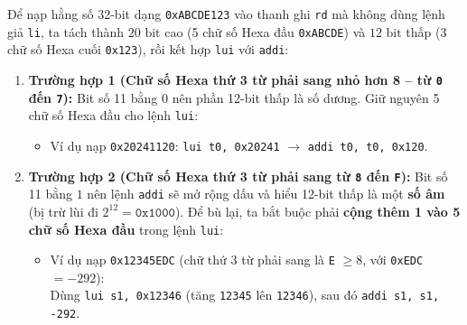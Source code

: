 \begin{tcolorbox}[bwbox, title={Quy tắc nạp hằng số 32-bit bất kỳ vào thanh ghi (Bản chất của lệnh giả \texttt{li})}]
Để nạp hằng số 32-bit dạng \texttt{0xABCDE123} vào thanh ghi \texttt{rd} mà không dùng lệnh giả \texttt{li}, ta tách thành $20\text{ bit}$ cao (5 chữ số Hexa đầu \texttt{0xABCDE}) và $12\text{ bit}$ thấp (3 chữ số Hexa cuối \texttt{0x123}), rồi kết hợp \texttt{lui} với \texttt{addi}:
\begin{enumerate}
    \item \textbf{Trường hợp 1 (Chữ số Hexa thứ 3 từ phải sang nhỏ hơn 8 -- từ \texttt{0} đến \texttt{7}):} Bit số 11 bằng $0$ nên phần 12-bit thấp là số dương. Giữ nguyên 5 chữ số Hexa đầu cho lệnh \texttt{lui}:
    \begin{itemize}
        \item Ví dụ nạp \texttt{0x20241120}: \texttt{lui t0, 0x20241} $\rightarrow$ \texttt{addi t0, t0, 0x120}.
    \end{itemize}
    \item \textbf{Trường hợp 2 (Chữ số Hexa thứ 3 từ phải sang từ \texttt{8} đến \texttt{F}):} Bit số 11 bằng $1$ nên lệnh \texttt{addi} sẽ mở rộng dấu và hiểu 12-bit thấp là một \textbf{số âm} (bị trừ lùi đi $2^{12} = \texttt{0x1000}$). Để bù lại, ta bắt buộc phải \textbf{cộng thêm 1 vào 5 chữ số Hexa đầu} trong lệnh \texttt{lui}:
    \begin{itemize}
        \item Ví dụ nạp \texttt{0x12345EDC} (chữ thứ 3 từ phải sang là \texttt{E} $\ge 8$, với \texttt{0xEDC} $= -292$):\\
        Dùng \texttt{lui s1, 0x12346} (tăng \texttt{12345} lên \texttt{12346}), sau đó \texttt{addi s1, s1, -292}.
    \end{itemize}
\end{enumerate}
\end{tcolorbox}

